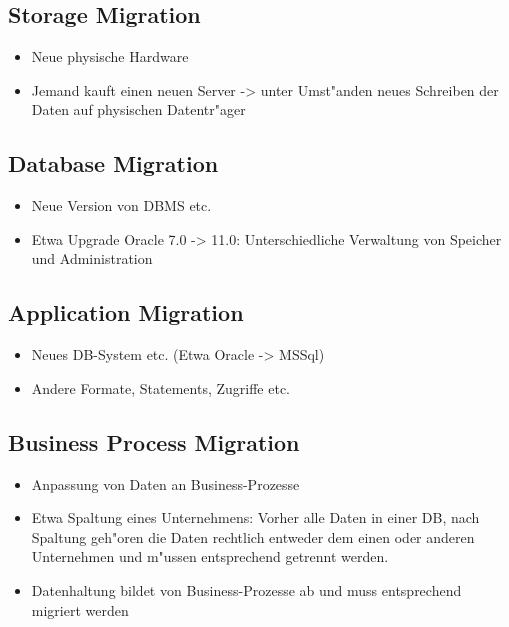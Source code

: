 \documentclass[11pt]{scrartcl}
\begin{document}
\subsection{Storage Migration}

\begin{itemize}
	\item Neue physische Hardware
	\item Jemand kauft einen neuen Server -> unter Umst"anden neues Schreiben der Daten auf physischen Datentr"ager
\end{itemize}

\subsection{Database Migration}

\begin{itemize}
	\item Neue Version von DBMS etc.
	\item Etwa Upgrade Oracle 7.0 -> 11.0: Unterschiedliche Verwaltung von Speicher und Administration
\end{itemize}

\subsection{Application Migration}

\begin{itemize}
	\item Neues DB-System etc. (Etwa Oracle -> MSSql)
	\item Andere Formate, Statements, Zugriffe etc.
\end{itemize}

\subsection{Business Process Migration}

\begin{itemize}
	\item Anpassung von Daten an Business-Prozesse
	\item Etwa Spaltung eines Unternehmens: Vorher alle Daten in einer DB, nach Spaltung geh"oren die Daten rechtlich entweder dem einen oder anderen Unternehmen und m"ussen entsprechend getrennt werden.
	\item Datenhaltung bildet von Business-Prozesse ab und muss entsprechend migriert werden
\end{itemize}
\end{document}
